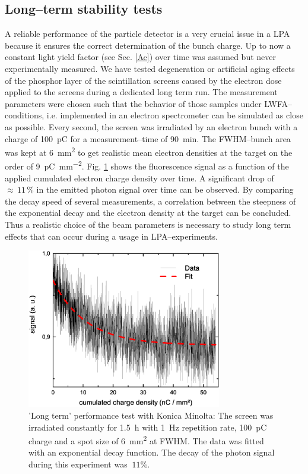 \documentclass[%
preprint,
amsmath,
amssymb,
aip,
rsi, 
numerical,
floatfix,
]{revtex4-1}
\begin{document}
\subsection{\label{Ls}Long--term stability tests}
A reliable performance of the particle detector is a very crucial issue in a LPA because it ensures the correct determination of the bunch charge.
Up to now a constant light yield factor (see Sec. \ref{Ac}) over time was assumed but never experimentally measured. 
We have tested degeneration or artificial aging effects of the phosphor layer of the scintillation screens caused by the electron dose applied to the screens during a dedicated long term run.
The measurement parameters were chosen such that the behavior of those samples under LWFA--conditions, i.e. implemented in an electron spectrometer can be simulated as close as possible.
Every second, the screen was irradiated by an electron bunch with a charge of \SI{100}{\pico\coulomb} for a measurement--time of \SI{90}{\minute}.
The FWHM--bunch area was kept at \SI{6}{\square\milli\meter} to get realistic mean electron densities at the target on the order of \SI[per-mode=symbol]{9}{\pico\coulomb \per \square\milli\meter}. 
Fig. \ref{fig:Dt_Min_rel} shows the fluorescence signal as a function of the applied cumulated electron charge density over time. 
A significant drop of $\approx\, 11\,\%$ in the emitted photon signal over time can be observed.
By comparing the decay speed of several measurements, a correlation between the steepness of the exponential decay and the electron density at the target can be concluded.
Thus a realistic choice of the beam parameters is necessary to study long term effects that can occur during a usage in LPA--experiments.
 
\begin{figure}
\includegraphics[width=8.5cm]{./Figures/Dt_Min_rel}%
\caption{\label{fig:Dt_Min_rel} 'Long term' performance test with Konica Minolta: 
The screen was irradiated constantly for \SI{1.5}{\hour} with \SI{1}{\hertz} repetition rate, \SI{100}{\pico\coulomb} charge and a spot size of \SI{6}{\square\milli\meter} at FWHM. 
The data was fitted with an exponential decay function. 
The decay of the photon signal during this experiment was $~11\%$.}
\end{figure}
\end{document}
